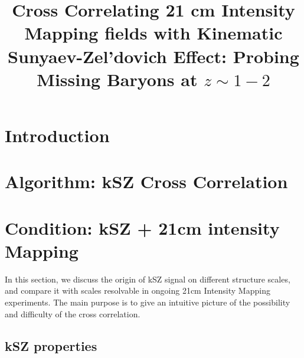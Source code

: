 \documentclass[aps,prd,twocolumn,showpacs,superscriptaddress,groupedaddress,nofootinbib]{revtex4}  %
\begin{document}
\widetext

\title{Cross Correlating 21 cm Intensity Mapping fields with Kinematic Sunyaev-Zel'dovich Effect: Probing Missing Baryons at $z\sim1-2$}


\pacs{}
\maketitle

\section{Introduction}

\section{Algorithm: kSZ Cross Correlation}

\section{Condition: kSZ + 21cm intensity Mapping}
In this section, we discuss the origin of kSZ signal 
on different structure scales, 
and compare it with scales resolvable in 
ongoing 21cm Intensity Mapping experiments. 
The main purpose is to give an intuitive picture of the possibility and
 difficulty of the cross correlation.
\subsection{kSZ properties}

\end{document}
